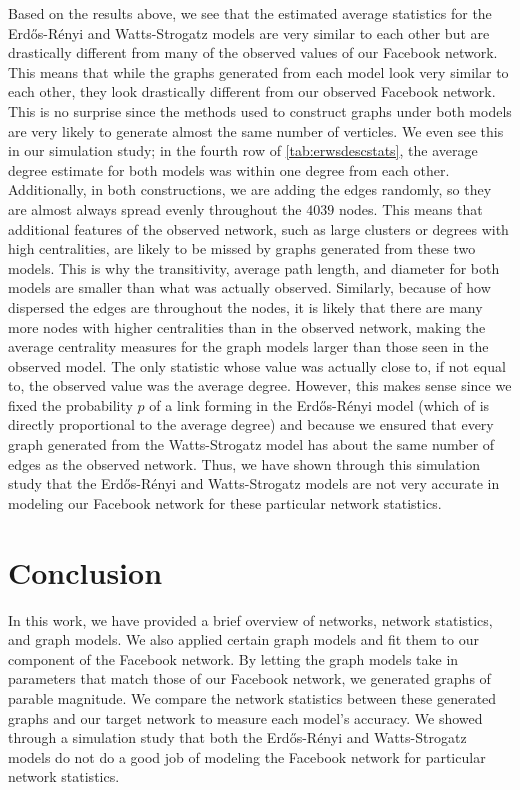 \documentclass[12pt,twoside]{amherstthesis}
\begin{document}
  Based on the results above, we see that the estimated average statistics
  for the Erdős-Rényi and Watts-Strogatz models are very similar to each
  other but are drastically different from many of the observed values of
  our Facebook network. This means that while the graphs generated from
  each model look very similar to each other, they look drastically
  different from our observed Facebook network. This is no surprise since
  the methods used to construct graphs under both models are very likely
  to generate almost the same number of verticles. We even see this in our
  simulation study; in the fourth row of \autoref{tab:erwsdescstats}, the
  average degree estimate for both models was within one degree from each
  other. Additionally, in both constructions, we are adding the edges
  randomly, so they are almost always spread evenly throughout the
  \(4039\) nodes. This means that additional features of the observed
  network, such as large clusters or degrees with high centralities, are
  likely to be missed by graphs generated from these two models. This is
  why the transitivity, average path length, and diameter for both models
  are smaller than what was actually observed. Similarly, because of how
  dispersed the edges are throughout the nodes, it is likely that there
  are many more nodes with higher centralities than in the observed
  network, making the average centrality measures for the graph models
  larger than those seen in the observed model. The only statistic whose
  value was actually close to, if not equal to, the observed value was the
  average degree. However, this makes sense since we fixed the probability
  \(p\) of a link forming in the Erdős-Rényi model (which of is directly
  proportional to the average degree) and because we ensured that every
  graph generated from the Watts-Strogatz model has about the same number
  of edges as the observed network. Thus, we have shown through this
  simulation study that the Erdős-Rényi and Watts-Strogatz models are not
  very accurate in modeling our Facebook network for these particular
  network statistics.
  
  \chapter*{Conclusion}\label{conclusion}
  
  \setcounter{chapter}{4} \setcounter{section}{0}
  
  In this work, we have provided a brief overview of networks, network
  statistics, and graph models. We also applied certain graph models and
  fit them to our component of the Facebook network. By letting the graph
  models take in parameters that match those of our Facebook network, we
  generated graphs of parable magnitude. We compare the network statistics
  between these generated graphs and our target network to measure each
  model's accuracy. We showed through a simulation study that both the
  Erdős-Rényi and Watts-Strogatz models do not do a good job of modeling
  the Facebook network for particular network statistics.
  
\end{document}
